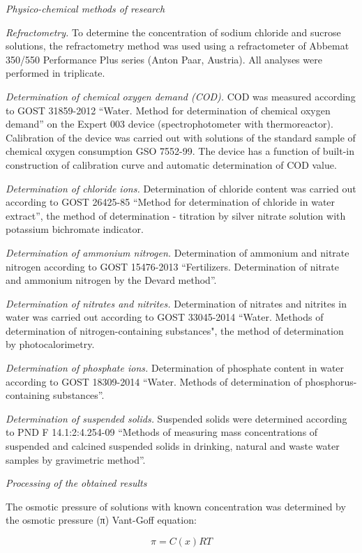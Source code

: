 \begin{multicols}{2}
\emph{Physico-chemical methods of research}

\emph{Refractometry.} To determine the concentration of sodium chloride
and sucrose solutions, the refractometry method was used using a
refractometer of Abbemat 350/550 Performance Plus series (Anton Paar,
Austria). All analyses were performed in triplicate.

\emph{Determination of chemical oxygen demand (COD).} COD was measured
according to GOST 31859-2012 ``Water. Method for determination of
chemical oxygen demand'' on the Expert 003 device (spectrophotometer
with thermoreactor). Calibration of the device was carried out with
solutions of the standard sample of chemical oxygen consumption GSO
7552-99. The device has a function of built-in construction of
calibration curve and automatic determination of COD value.

\emph{Determination of chloride ions.} Determination of chloride content
was carried out according to GOST 26425-85 ``Method for determination of
chloride in water extract'', the method of determination - titration by
silver nitrate solution with potassium bichromate indicator.

\emph{Determination of ammonium nitrogen.} Determination of ammonium and
nitrate nitrogen according to GOST 15476-2013 ``Fertilizers.
Determination of nitrate and ammonium nitrogen by the Devard method''.

\emph{Determination of nitrates and nitrites.} Determination of nitrates
and nitrites in water was carried out according to GOST 33045-2014
``Water. Methods of determination of nitrogen-containing substances",
the method of determination by photocalorimetry.

\emph{Determination of phosphate ions.} Determination of phosphate
content in water according to GOST 18309-2014 ``Water. Methods of
determination of phosphorus-containing substances''.

\emph{Determination of suspended solids.} Suspended solids were
determined according to PND F 14.1:2:4.254-09 ``Methods of measuring
mass concentrations of suspended and calcined suspended solids in
drinking, natural and waste water samples by gravimetric method''.

\emph{Processing of the obtained results}

The osmotic pressure of solutions with known concentration was
determined by the osmotic pressure (π) Vant-Goff equation:

\begin{equation}
\pi = C(x)RT
\end{equation}


\end{multicols}

